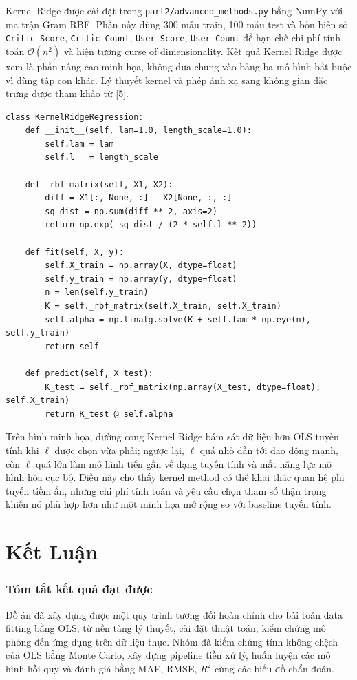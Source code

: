 \documentclass[12pt,a4paper]{article}
\begin{document}
Kernel Ridge được cài đặt trong \texttt{part2/advanced\_methods.py} bằng NumPy với ma trận Gram RBF. Phần này dùng 300 mẫu train, 100 mẫu test và bốn biến số \texttt{Critic\_Score}, \texttt{Critic\_Count}, \texttt{User\_Score}, \texttt{User\_Count} để hạn chế chi phí tính toán $\mathcal{O}(n^2)$ và hiện tượng curse of dimensionality. Kết quả Kernel Ridge được xem là phần nâng cao minh họa, không đưa chung vào bảng ba mô hình bắt buộc vì dùng tập con khác.
Lý thuyết kernel và phép ánh xạ sang không gian đặc trưng được tham khảo từ [5].

\begin{lstlisting}[caption={Lớp Kernel Ridge Regression trong \texttt{part2/advanced\_methods.py}}]
class KernelRidgeRegression:
    def __init__(self, lam=1.0, length_scale=1.0):
        self.lam = lam
        self.l   = length_scale

    def _rbf_matrix(self, X1, X2):
        diff = X1[:, None, :] - X2[None, :, :]
        sq_dist = np.sum(diff ** 2, axis=2)
        return np.exp(-sq_dist / (2 * self.l ** 2))

    def fit(self, X, y):
        self.X_train = np.array(X, dtype=float)
        self.y_train = np.array(y, dtype=float)
        n = len(self.y_train)
        K = self._rbf_matrix(self.X_train, self.X_train)
        self.alpha = np.linalg.solve(K + self.lam * np.eye(n), self.y_train)
        return self

    def predict(self, X_test):
        K_test = self._rbf_matrix(np.array(X_test, dtype=float), self.X_train)
        return K_test @ self.alpha
\end{lstlisting}

Trên hình minh họa, đường cong Kernel Ridge bám sát dữ liệu hơn OLS tuyến tính khi $\ell$ được chọn vừa phải; ngược lại, $\ell$ quá nhỏ dẫn tới dao động mạnh, còn $\ell$ quá lớn làm mô hình tiến gần về dạng tuyến tính và mất năng lực mô hình hóa cục bộ. Điều này cho thấy kernel method có thể khai thác quan hệ phi tuyến tiềm ẩn, nhưng chi phí tính toán và yêu cầu chọn tham số thận trọng khiến nó phù hợp hơn như một minh họa mở rộng so với baseline tuyến tính.

\part{Kết Luận}

\section{Tóm tắt kết quả đạt được}
Đồ án đã xây dựng được một quy trình tương đối hoàn chỉnh cho bài toán data fitting bằng OLS, từ nền tảng lý thuyết, cài đặt thuật toán, kiểm chứng mô phỏng đến ứng dụng trên dữ liệu thực. Nhóm đã kiểm chứng tính không chệch của OLS bằng Monte Carlo, xây dựng pipeline tiền xử lý, huấn luyện các mô hình hồi quy và đánh giá bằng MAE, RMSE, $R^2$ cùng các biểu đồ chẩn đoán.
\end{document}
